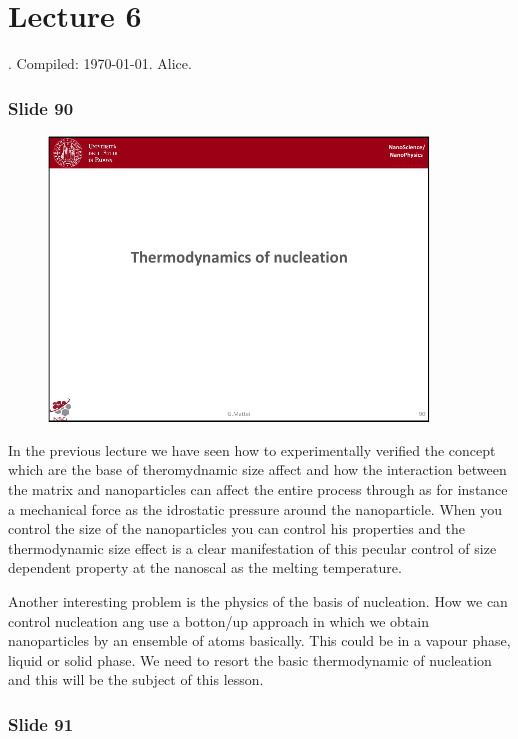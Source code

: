\documentclass[../main/main.tex]{subfiles}
\begin{document}
\section{Lecture 6}
. Compiled:  \today. Alice.


\subsubsection{Slide 90}

\begin{figure}[h!]
\centering
\includegraphics[page=1,width=0.9\textwidth]{../lessons/pdf_file/6_lesson.pdf}
\end{figure}


In the previous lecture we have seen how to experimentally verified the concept which are the base of theromydnamic size affect and how the interaction between the matrix and nanoparticles can affect the entire process through as for instance a mechanical force as the idrostatic pressure around the nanoparticle. When you control the size of the nanoparticles you can control his properties and the thermodynamic size effect is a clear manifestation of this pecular control of size dependent property at the nanoscal as the melting temperature.

Another interesting problem is the physics of the basis of nucleation. How we can control nucleation ang use a botton/up approach in which we obtain nanoparticles by an ensemble of atoms basically. This could be in a vapour phase, liquid or solid phase. We need to resort the basic thermodynamic of nucleation and this will be the subject of this lesson.

\newpage
\subsubsection{Slide 91}
\end{document}
